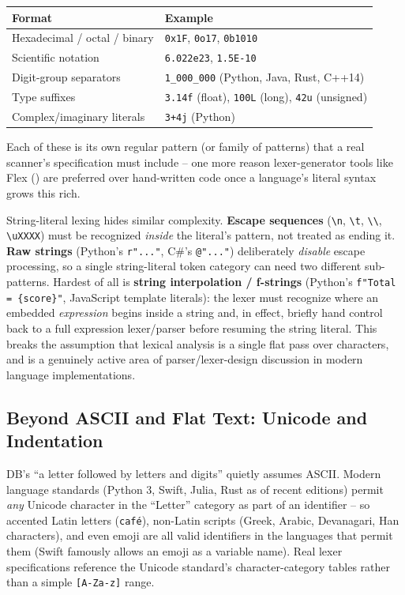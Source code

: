 \documentclass[full-course-notes.tex]{subfiles}
\begin{document}
\begin{center}
\small
\begin{tabularx}{\textwidth}{@{}l X@{}}
\toprule
\textbf{Format} & \textbf{Example} \\
\midrule
Hexadecimal / octal / binary & \texttt{0x1F}, \texttt{0o17}, \texttt{0b1010} \\
Scientific notation & \texttt{6.022e23}, \texttt{1.5E-10} \\
Digit-group separators & \texttt{1\_000\_000} (Python, Java, Rust, C++14) \\
Type suffixes & \texttt{3.14f} (float), \texttt{100L} (long), \texttt{42u} (unsigned) \\
Complex/imaginary literals & \texttt{3+4j} (Python) \\
\bottomrule
\end{tabularx}
\end{center}

Each of these is its own regular pattern (or family of patterns) that a real scanner's
specification must include -- one more reason lexer-generator tools like Flex
() are preferred over hand-written code once a language's literal
syntax grows this rich.

String-literal lexing hides similar complexity. \textbf{Escape sequences}
(\texttt{\textbackslash n}, \texttt{\textbackslash t}, \texttt{\textbackslash\textbackslash},
\texttt{\textbackslash uXXXX}) must be recognized \emph{inside} the literal's pattern, not
treated as ending it. \textbf{Raw strings} (Python's \texttt{r"..."}, C\#'s \texttt{@"..."})
deliberately \emph{disable} escape processing, so a single string-literal token category can
need two different sub-patterns. Hardest of all is \textbf{string interpolation / f-strings}
(Python's \texttt{f"Total = \{score\}"}, JavaScript template literals): the lexer must recognize
where an embedded \emph{expression} begins inside a string and, in effect, briefly hand control
back to a full expression lexer/parser before resuming the string literal. This breaks the
assumption that lexical analysis is a single flat pass over characters, and is a genuinely
active area of parser/lexer-design discussion in modern language implementations.

\subsection{Beyond ASCII and Flat Text: Unicode and Indentation}

DB's ``a letter followed by letters and digits'' quietly assumes ASCII. Modern language
standards (Python 3, Swift, Julia, Rust as of recent editions) permit \emph{any} Unicode
character in the ``Letter'' category as part of an identifier -- so accented Latin letters
(\texttt{caf\'e}), non-Latin scripts (Greek, Arabic, Devanagari, Han characters), and even emoji
are all valid identifiers in the languages that permit them (Swift famously allows an emoji as a
variable name). Real lexer specifications reference the Unicode standard's character-category
tables rather than a simple \texttt{[A-Za-z]} range.
\end{document}
